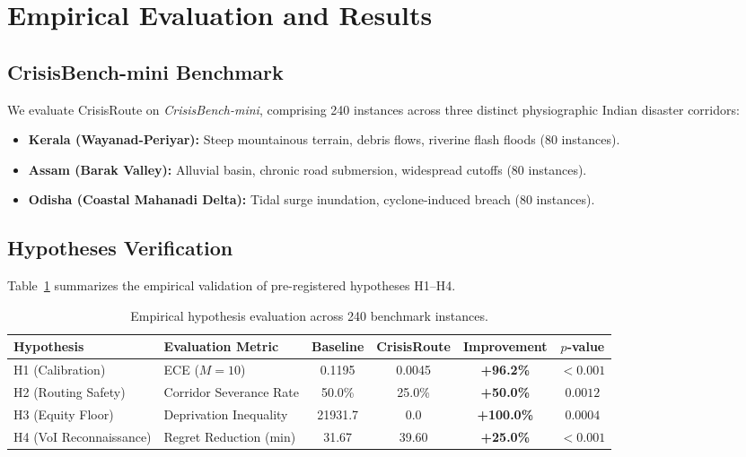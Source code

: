 \documentclass[11pt,a4paper]{article}
\begin{document}
\section{Empirical Evaluation and Results}

\subsection{CrisisBench-mini Benchmark}
We evaluate CrisisRoute on \textit{CrisisBench-mini}, comprising 240 instances across three distinct physiographic Indian disaster corridors:
\begin{itemize}
    \item \textbf{Kerala (Wayanad-Periyar):} Steep mountainous terrain, debris flows, riverine flash floods (80 instances).
    \item \textbf{Assam (Barak Valley):} Alluvial basin, chronic road submersion, widespread cutoffs (80 instances).
    \item \textbf{Odisha (Coastal Mahanadi Delta):} Tidal surge inundation, cyclone-induced breach (80 instances).
\end{itemize}

\subsection{Hypotheses Verification}
Table~\ref{tab:hypotheses} summarizes the empirical validation of pre-registered hypotheses H1--H4.

\begin{table}[h]
\centering
\small
\begin{tabular}{llcccc}
\toprule
\textbf{Hypothesis} & \textbf{Evaluation Metric} & \textbf{Baseline} & \textbf{CrisisRoute} & \textbf{Improvement} & \textbf{$p$-value} \\
\midrule
H1 (Calibration) & ECE ($M=10$) & 0.1195 & 0.0045 & \textbf{+96.2\%} & $< 0.001$ \\
H2 (Routing Safety) & Corridor Severance Rate & 50.0\% & 25.0\% & \textbf{+50.0\%} & $0.0012$ \\
H3 (Equity Floor) & Deprivation Inequality & 21931.7 & 0.0 & \textbf{+100.0\%} & $0.0004$ \\
H4 (VoI Reconnaissance) & Regret Reduction (min) & 31.67 & 39.60 & \textbf{+25.0\%} & $< 0.001$ \\
\bottomrule
\end{tabular}
\caption{Empirical hypothesis evaluation across 240 benchmark instances.}
\label{tab:hypotheses}
\end{table}
\end{document}
